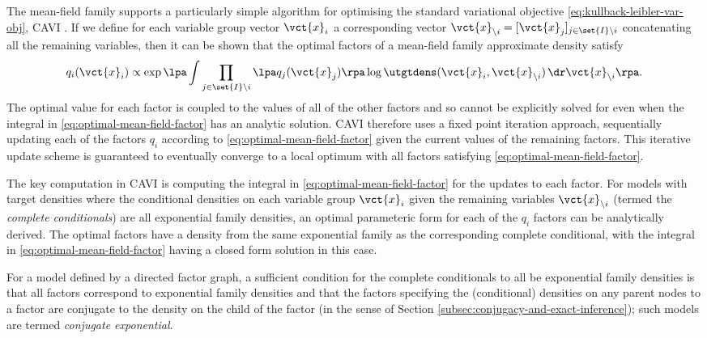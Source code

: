 The mean-field family supports a particularly simple algorithm for optimising the standard variational objective \eqref{eq:kullback-leibler-var-obj}, \ac{CAVI} \citep{bishop2006pattern,blei2017variational}. If we define for each variable group vector $\vct{x}_i$ a corresponding vector $\vct{x}_{\setminus i} = [\vct{x}_j]_{j\in\set{I}\setminus i}$ concatenating all the remaining variables, then it can be shown that the optimal factors of a mean-field family approximate density satisfy
\begin{equation}\label{eq:optimal-mean-field-factor}
  q_i(\vct{x}_i) \propto \exp\lpa
    \int \prod_{j\in\set{I}\setminus i} \lpa q_j(\vct{x}_j) \rpa \log\utgtdens(\vct{x}_i, \vct{x}_{\setminus i})
    \,\dr\vct{x}_{\setminus i}
  \rpa.
\end{equation}
The optimal value for each factor is coupled to the values of all of the other factors and so cannot be explicitly solved for even when the integral in \eqref{eq:optimal-mean-field-factor} has an analytic solution. \ac{CAVI} therefore uses a fixed point iteration approach, sequentially updating each of the factors $q_{i}$ according to \eqref{eq:optimal-mean-field-factor} given the current values of the remaining factors. This iterative update scheme is guaranteed to eventually converge to a local optimum with all factors satisfying \eqref{eq:optimal-mean-field-factor}.

The key computation in \ac{CAVI} is computing the integral in \eqref{eq:optimal-mean-field-factor} for the updates to each factor. For models with target densities where the conditional densities on each variable group $\vct{x}_i$ given the remaining variables $\vct{x}_{\setminus i}$ (termed the \emph{complete conditionals}) are all exponential family densities, an optimal parameteric form for each of the $q_{i}$ factors can be analytically derived. The optimal factors have a density from the same exponential family as the corresponding complete conditional, with the integral in \eqref{eq:optimal-mean-field-factor} having a closed form solution in this case. 

For a model defined by a directed factor graph, a sufficient condition for the complete conditionals to all be exponential family densities is that all factors correspond to exponential family densities and that the factors specifying the (conditional) densities on any parent nodes to a factor are conjugate to the density on the child of the factor (in the sense of Section \ref{subsec:conjugacy-and-exact-inference}); such models are termed \emph{conjugate exponential}. 

